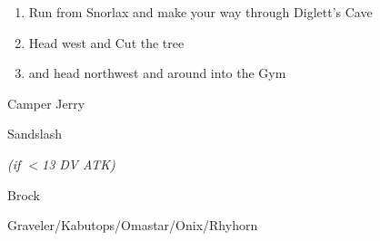 \begin{paracol}{2}
\begin{enumerate}[resume]
	\item Run from Snorlax and make your way through Diglett's Cave
	\item Head west and Cut the tree
	\item {} and head northwest and around into the Gym
\end{enumerate}

\begin{trainer}{Camper Jerry}
	\varwb
	\begin{fightSection}{Sandslash}
		\item {} \return
		\begin{notes}
			\small{\item {} \icePunch{} \textit{(if $<$13 DV ATK)}}
		\end{notes}
	\end{fightSection}
	\varwe
\end{trainer}

\begin{boss}{Brock}
	\varwb
	\begin{fightSection}{Graveler/Kabutops/Omastar/Onix/Rhyhorn}
		\item {} \surf{} 
	\end{fightSection}
	\varwe
\end{boss}

\end{paracol}
\vspace{3.5mm} 